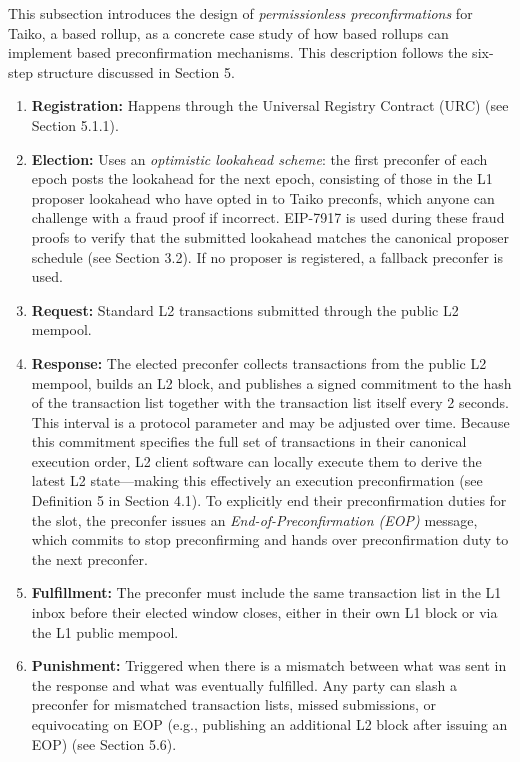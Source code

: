 \documentclass[a4paper]{article}
\theoremstyle{boldstyle}
\begin{document}
        This subsection introduces the design of \emph{permissionless preconfirmations} for Taiko, a based rollup, as a concrete case study of how based rollups can implement based preconfirmation mechanisms. This description follows the six-step structure discussed in Section 5.
        
        \begin{enumerate}
        \item \textbf{Registration:} Happens through the Universal Registry Contract (URC) (see Section 5.1.1).
        \item \textbf{Election:} Uses an \emph{optimistic lookahead scheme}: the first preconfer of each epoch posts the lookahead for the next epoch, consisting of those in the L1 proposer lookahead who have opted in to Taiko preconfs, which anyone can challenge with a fraud proof if incorrect. EIP-7917 is used during these fraud proofs to verify that the submitted lookahead matches the canonical proposer schedule (see Section 3.2). If no proposer is registered, a fallback preconfer is used.
        \item \textbf{Request:} Standard L2 transactions submitted through the public L2 mempool.
        \item \textbf{Response:} The elected preconfer collects transactions from the public L2 mempool, builds an L2 block, and publishes a signed commitment to the hash of the transaction list together with the transaction list itself every 2 seconds. This interval is a protocol parameter and may be adjusted over time. Because this commitment specifies the full set of transactions in their canonical execution order, L2 client software can locally execute them to derive the latest L2 state—making this effectively an execution preconfirmation (see Definition 5 in Section 4.1). To explicitly end their preconfirmation duties for the slot, the preconfer issues an \emph{End-of-Preconfirmation (EOP)} message, which commits to stop preconfirming and hands over preconfirmation duty to the next preconfer.
        \item \textbf{Fulfillment:} The preconfer must include the same transaction list in the L1 inbox before their elected window closes, either in their own L1 block or via the L1 public mempool.
        \item \textbf{Punishment:} Triggered when there is a mismatch between what was sent in the response and what was eventually fulfilled. Any party can slash a preconfer for mismatched transaction lists, missed submissions, or equivocating on EOP (e.g., publishing an additional L2 block after issuing an EOP) (see Section 5.6).
        \end{enumerate}
        
\end{document}
